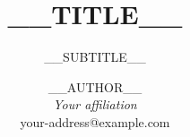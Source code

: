 \documentclass[final]{ols}
\begin{document}

\title{__TITLE__}
\subtitle{__SUBTITLE__}  %
\date{}             %


\author{%
__AUTHOR__ \\
{\itshape Your affiliation}\\
{\ttfamily\normalsize your-address@example.com}\\
} %

\maketitle

\begin{abstract}

\end{abstract}

\end{document}
